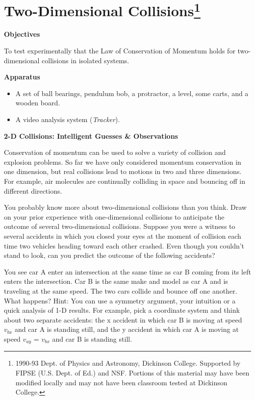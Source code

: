 
\section{Two-Dimensional Collisions\footnote{
1990-93 Dept. of Physics and Astronomy, Dickinson College. Supported by FIPSE
(U.S. Dept. of Ed.) and NSF. Portions of this material may have been modified
locally and may not have been classroom tested at Dickinson College.
}}

\makelabheader %

\bigskip
\textbf{Objectives} 

To test experimentally that the Law of Conservation of Momentum holds for two-dimensional
collisions in isolated systems.

\bigskip
\textbf{Apparatus}

\begin{itemize}
\item A set of ball bearings, pendulum bob, a protractor, a level, some carts, 
and a wooden board.
\item A video analysis system (\textit{Tracker}).
\end{itemize}

\bigskip
\textbf{2-D Collisions: Intelligent Guesses \& Observations }

Conservation of momentum can be used to solve a variety of collision and explosion
problems. So far we have only considered momentum conservation in one dimension,
but real collisions lead to motions in two and three dimensions. For example,
air molecules are continually colliding in space and bouncing off in different
directions. 

You probably know more about two-dimensional collisions than you think. Draw
on your prior experience with one-dimensional collisions to anticipate the outcome
of several two-dimensional collisions. Suppose you were a witness to several
accidents in which you closed your eyes at the moment of collision each time
two vehicles heading toward each other crashed. Even though you couldn't stand
to look, can you predict the outcome of the following accidents?

You see car A enter an intersection at the same time as car B coming from its
left enters the intersection. Car B is the same make and model as car A and
is traveling at the same speed. The two cars collide and bounce off one another.
What happens? Hint: You can use a symmetry argument, your intuition or a quick
analysis of 1-D results. For example, pick a coordinate system and think about
two separate accidents: the x accident in which car B is moving at speed \( v_{bx} \)
and car A is standing still, and the y accident in which car A is moving at
speed \( v_{ay} \) = \( v_{bx} \) and car B is standing still. 

